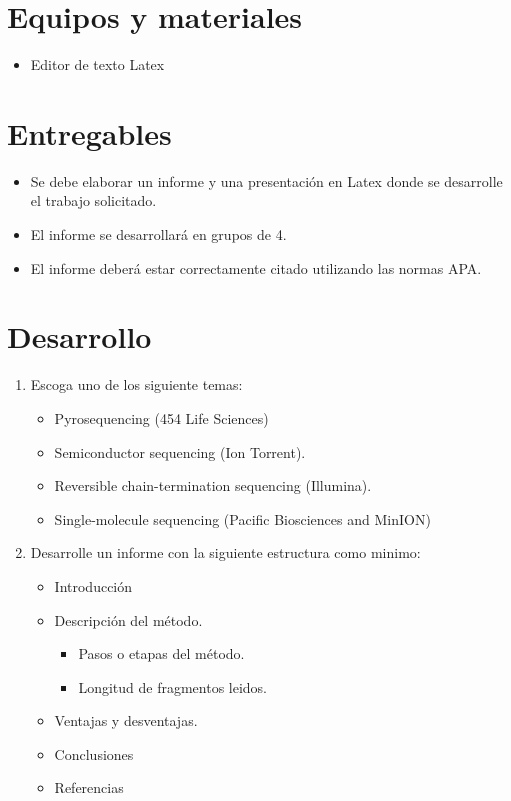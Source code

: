 \documentclass{article}
\begin{document}
	\section{Equipos y materiales}
	\begin{itemize}
		\item Editor de texto  Latex 
	\end{itemize}
	
	\section{Entregables}
	\begin{itemize}
		\item Se debe elaborar un informe y una presentación en Latex donde se desarrolle el trabajo solicitado.
		\item El informe se desarrollará en grupos de 4.
		\item El informe deberá estar correctamente citado utilizando las normas APA.
	\end{itemize}
		
	
	
	\clearpage
	
	
	\section{Desarrollo}\label{sec:ejercicios}
	\begin{enumerate}
		\item Escoga uno de los siguiente temas:
			\begin{itemize}
				\item Pyrosequencing (454 Life Sciences)
				\item Semiconductor sequencing (Ion Torrent).			
				\item Reversible chain-termination sequencing (Illumina).			
				\item Single-molecule sequencing (Pacific Biosciences and MinION)	
			\end{itemize}
		\item Desarrolle un informe con la siguiente estructura como minimo:
			\begin{itemize}
				\item Introducción
				\item Descripción del método.
					\begin{itemize}
						\item Pasos o etapas del método.
						\item Longitud de fragmentos leidos.
					\end{itemize}
				\item Ventajas y desventajas.			
				\item Conclusiones
				\item Referencias
			\end{itemize}
			
	\end{enumerate}
	
	
	
\end{document}
